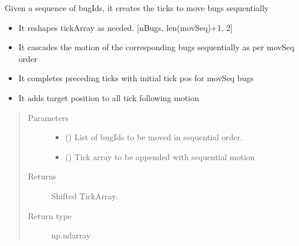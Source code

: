 \documentclass[letterpaper,10pt,english]{sphinxmanual}
\begin{document}
\begin{fulllineitems}
\label{\detokenize{reference:taipanPyRouter.shiftTickArray}}
Given a sequence of bugIds, it creates the ticks to move bugs sequentially
\begin{itemize}
\item {} 
It reshapes tickArray as needed. {[}nBugs, len(movSeq)+1, 2{]}

\item {} 
It cascades the motion of the corresponding bugs sequentially as per movSeq order

\item {} 
It completes preceding ticks with initial tick pos for movSeq bugs

\item {} 
It adds target position to all tick following motion

\end{itemize}
\begin{quote}\begin{description}
\item[{Parameters}] \leavevmode\begin{itemize}
\item {} 
 () \textendash{} List of bugIds to be moved in sequential order.

\item {} 
 () \textendash{} Tick array to be appended with sequential motion

\end{itemize}

\item[{Returns}] \leavevmode
Shifted TickArray.

\item[{Return type}] \leavevmode
np.ndarray

\end{description}\end{quote}

\end{fulllineitems}

\end{document}
